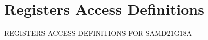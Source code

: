 \hypertarget{group___s_a_m_d21_g18_a__reg}{}\section{Registers Access Definitions}
\label{group___s_a_m_d21_g18_a__reg}
R\+E\+G\+I\+S\+T\+E\+RS A\+C\+C\+E\+SS D\+E\+F\+I\+N\+I\+T\+I\+O\+NS F\+OR S\+A\+M\+D21\+G18A 